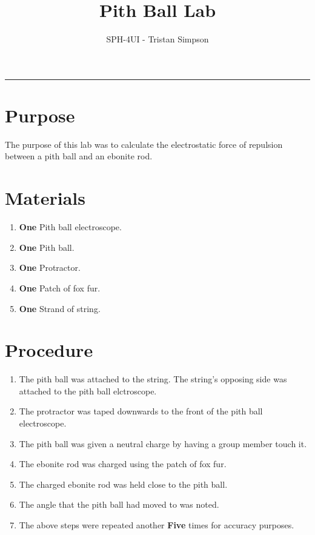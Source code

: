 \documentclass{article}
\title{Pith Ball Lab}
\author{SPH-4UI - Tristan Simpson}
\begin{document}
\maketitle

\vspace{0.5cm}
\hrule
\vspace{0.5cm}
\section*{Purpose}
The purpose of this lab was to calculate the electrostatic force of repulsion between a pith ball and an ebonite rod.

\section*{Materials}
\begin{enumerate}
    \item {\textbf{One} Pith ball electroscope.}
    \item {\textbf{One} Pith ball.}
    \item {\textbf{One} Protractor.}
    \item {\textbf{One} Patch of fox fur.}
    \item {\textbf{One} Strand of string.}
\end{enumerate}

\section*{Procedure}
\begin{enumerate}
    \item {The pith ball was attached to the string. The string's opposing side was attached to the pith ball elctroscope.}
    \item {The protractor was taped downwards to the front of the pith ball electroscope.}
    \item {The pith ball was given a neutral charge by having a group member touch it.}
    \item {The ebonite rod was charged using the patch of fox fur.}
    \item {The charged ebonite rod was held close to the pith ball.}
    \item {The angle that the pith ball had moved to was noted.}
    \item {The above steps were repeated another \textbf{Five} times for accuracy purposes.}
\end{enumerate}\leavevmode
\end{document}
